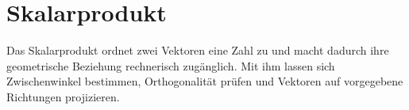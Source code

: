 \section{Skalarprodukt}
\label{sec:vector_algebra_scalar_product}

Das Skalarprodukt ordnet zwei Vektoren eine Zahl zu und macht dadurch ihre
geometrische Beziehung rechnerisch zugänglich. Mit ihm lassen sich Zwischenwinkel
bestimmen, Orthogonalität prüfen und Vektoren auf vorgegebene
Richtungen projizieren.






